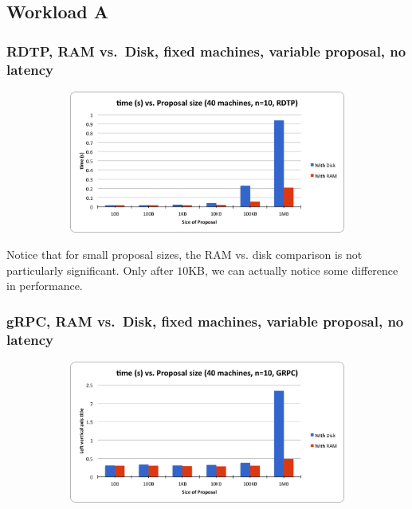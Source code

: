 \documentclass[12pt,]{article}
\begin{document}
\subsection{Workload A}\label{workload-a}

\subsubsection{RDTP, RAM vs.~Disk, fixed machines, variable proposal, no
latency}\label{rdtp-ram-vs.disk-fixed-machines-variable-proposal-no-latency}

\begin{figure}[H]
\centering
\begin{subfigure}{0.8\textwidth}
    \centering
    \includegraphics[width=1.0\textwidth]{RDTP_fixed_machines_variable_proposal_no_latency.png}
\end{subfigure}
\end{figure}

\medskip

Notice that for small proposal sizes, the RAM vs. disk comparison is not
particularly significant. Only after $10$KB, we can actually notice some
difference in performance.

\subsubsection{gRPC, RAM vs.~Disk, fixed machines, variable proposal, no
latency}\label{grpc-ram-vs.disk-fixed-machines-variable-proposal-no-latency}

\begin{figure}[H]
\centering
\begin{subfigure}{0.8\textwidth}
    \centering
    \includegraphics[width=1.0\textwidth]{GRPC_fixed_machines_variable_proposal_no_latency.png}
\end{subfigure}
\end{figure}
\end{document}

